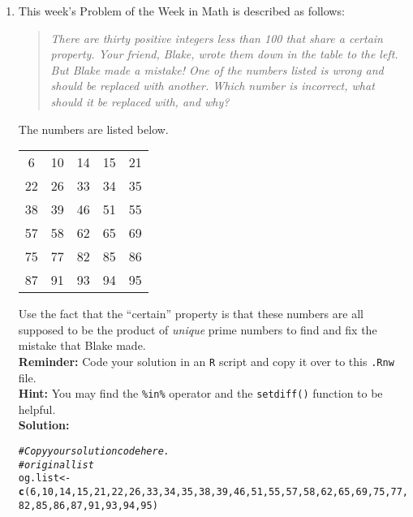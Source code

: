 \documentclass{article}\usepackage[]{graphicx}\usepackage[]{xcolor}
\makeatletter
\newcommand{\hlnum}[1]{\textcolor[rgb]{0.686,0.059,0.569}{#1}}%
\newcommand{\hlcom}[1]{\textcolor[rgb]{0.678,0.584,0.686}{\textit{#1}}}%
\newcommand{\hldef}[1]{\textcolor[rgb]{0.345,0.345,0.345}{#1}}%
\newcommand{\hlkwb}[1]{\textcolor[rgb]{0.69,0.353,0.396}{#1}}%
\newcommand{\hlkwd}[1]{\textcolor[rgb]{0.737,0.353,0.396}{\textbf{#1}}}%
\newenvironment{kframe}{%
 \def\at@end@of@kframe{}%
 \ifinner\ifhmode%
  \def\at@end@of@kframe{\end{minipage}}%
  \begin{minipage}{\columnwidth}%
 \fi\fi%
 \def\FrameCommand##1{\hskip\@totalleftmargin \hskip-\fboxsep
 \colorbox{shadecolor}{##1}\hskip-\fboxsep
     \hskip-\linewidth \hskip-\@totalleftmargin \hskip\columnwidth}%
 \MakeFramed {\advance\hsize-\width
   \@totalleftmargin\z@ \linewidth\hsize
   \@setminipage}}%
 {\par\unskip\endMakeFramed%
 \at@end@of@kframe}
\newenvironment{knitrout}{}{} %
\makeatother
\begin{document}
\begin{enumerate}
\item This week's Problem of the Week in Math is described as follows:
\begin{quotation}
  \textit{There are thirty positive integers less than 100 that share a certain 
  property. Your friend, Blake, wrote them down in the table to the left. But 
  Blake made a mistake! One of the numbers listed is wrong and should be replaced 
  with another. Which number is incorrect, what should it be replaced with, and 
  why?}
\end{quotation}
The numbers are listed below.
\begin{center}
  \begin{tabular}{ccccc}
    6 & 10 & 14 & 15 & 21\\
    22 & 26 & 33 & 34 & 35\\
    38 & 39 & 46 & 51 & 55\\
    57 & 58 & 62 & 65 & 69\\
    75 & 77 & 82 & 85 & 86\\
    87 & 91 & 93 & 94 & 95
  \end{tabular}
\end{center}
Use the fact that the ``certain'' property is that these numbers are all supposed
to be the product of \emph{unique} prime numbers to find and fix the mistake that
Blake made.\\
\textbf{Reminder:} Code your solution in an \texttt{R} script and copy it over
to this \texttt{.Rnw} file.\\
\textbf{Hint:} You may find the \verb|%in%| operator and the \verb|setdiff()| function to be helpful.\\

\textbf{Solution:} 

\begin{knitrout}\scriptsize
{}\color{fgcolor}\begin{kframe}
\begin{alltt}
\hlcom{# Copy your solution code here.}
\hlcom{#original list}
\hldef{og.list} \hlkwb{<-} \hlkwd{c}\hldef{(}\hlnum{6}\hldef{,}\hlnum{10}\hldef{,}\hlnum{14}\hldef{,}\hlnum{15}\hldef{,}\hlnum{21}\hldef{,}\hlnum{22}\hldef{,}\hlnum{26}\hldef{,}\hlnum{33}\hldef{,}\hlnum{34}\hldef{,}\hlnum{35}\hldef{,}\hlnum{38}\hldef{,}\hlnum{39}\hldef{,}\hlnum{46}\hldef{,}\hlnum{51}\hldef{,}\hlnum{55}\hldef{,}\hlnum{57}\hldef{,}\hlnum{58}\hldef{,}\hlnum{62}\hldef{,}\hlnum{65}\hldef{,}\hlnum{69}\hldef{,}\hlnum{75}\hldef{,}\hlnum{77}\hldef{,}\hlnum{82}\hldef{,}\hlnum{85}\hldef{,}\hlnum{86}\hldef{,}\hlnum{87}\hldef{,}\hlnum{91}\hldef{,}\hlnum{93}\hldef{,}\hlnum{94}\hldef{,}\hlnum{95}\hldef{)}


\end{alltt}
\end{kframe}
\end{knitrout}
\end{enumerate}
\end{document}
